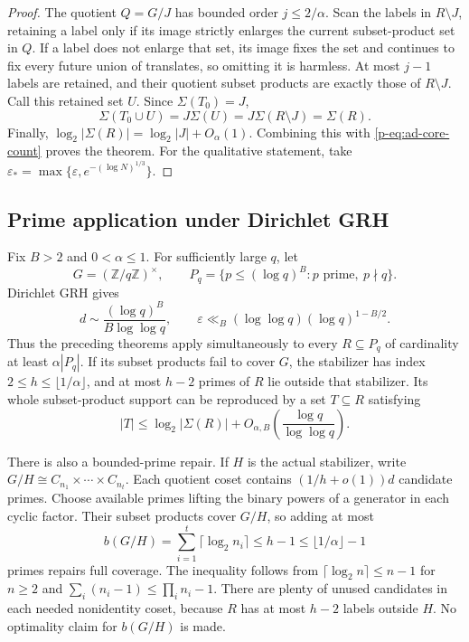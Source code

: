 \documentclass[11pt,a4paper]{article}
\theoremstyle{definition}
\theoremstyle{remark}
\begin{document}
\begin{proof}
The quotient $Q=G/J$ has bounded order $j\leq2/\alpha$.
Scan the labels in $R\setminus J$, retaining a label only if its image
strictly enlarges the current subset-product set in $Q$. If a label
does not enlarge that set, its image fixes the set and continues to
fix every future union of translates, so omitting it is harmless.
At most $j-1$ labels are retained, and their quotient subset products
are exactly those of $R\setminus J$. Call this retained set $U$.
Since $\Sigma(T_0)=J$,
\[
 \Sigma(T_0\cup U)
 =J\Sigma(U)
 =J\Sigma(R\setminus J)
 =\Sigma(R).
\]
Finally, $\log_2|\Sigma(R)|=\log_2|J|+O_\alpha(1)$.
Combining this with \eqref{p-eq:ad-core-count} proves the theorem.
For the qualitative statement, take
$\varepsilon_* =\max\{\varepsilon,e^{-(\log N)^{1/3}}\}$.
\end{proof}

\subsection{Prime application under Dirichlet GRH}

Fix $B>2$ and $0<\alpha\leq1$. For sufficiently large $q$, let
\[
 G=(\mathbb Z/q\mathbb Z)^\times,
 \qquad P_q=\{p\leq(\log q)^B:p\text{ prime},\ p\nmid q\}.
\]
Dirichlet GRH gives\[
 d\sim\frac{(\log q)^B}{B\log\log q},\qquad
 \varepsilon\ll_B(\log\log q)(\log q)^{1-B/2}.
\]
Thus the preceding theorems apply simultaneously to every
$R\subseteq P_q$ of cardinality at least $\alpha|P_q|$.
If its subset products fail to cover $G$, the stabilizer has index
$2\leq h\leq\lfloor1/\alpha\rfloor$, and at most $h-2$ primes of
$R$ lie outside that stabilizer. Its whole subset-product support can
be reproduced by a set $T\subseteq R$ satisfying
\[
 |T|\leq\log_2|\Sigma(R)|+
 O_{\alpha,B}\left(\frac{\log q}{\log\log q}\right).
\]

There is also a bounded-prime repair. If $H$ is the actual stabilizer,
write $G/H\cong C_{n_1}\times\cdots\times C_{n_t}$. Each quotient
coset contains $(1/h+o(1))d$ candidate primes. Choose available primes
lifting the binary powers of a generator in each cyclic factor.
Their subset products cover $G/H$, so adding at most
\[
 b(G/H)=\sum_{i=1}^t\lceil\log_2 n_i\rceil
 \leq h-1\leq\lfloor1/\alpha\rfloor-1
\]
primes repairs full coverage. The inequality follows from
$\lceil\log_2n\rceil\leq n-1$ for $n\geq2$ and
$\sum_i(n_i-1)\leq\prod_i n_i-1$. There are plenty of unused candidates
in each needed nonidentity coset, because $R$ has at most $h-2$ labels
outside $H$. No optimality claim for $b(G/H)$ is made.
\end{document}
